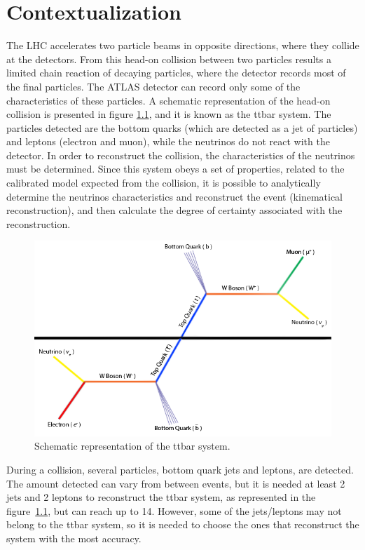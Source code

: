 
\chapter{Contextualization}

The LHC accelerates two particle beams in opposite directions, where they collide at the detectors. From this head-on collision between two particles results a limited chain reaction of decaying particles, where the detector records most of the final particles. The ATLAS detector can record only some of the characteristics of these particles. A schematic representation of the head-on collision is presented in figure \ref{fig:ttbar}, and it is known as the ttbar system. The particles detected are the bottom quarks (which are detected as a jet of particles) and leptons (electron and muon), while the neutrinos do not react with the detector. In order to reconstruct the collision, the characteristics of the neutrinos must be determined. Since this system obeys a set of properties, related to the calibrated model expected from the collision, it is possible to analytically determine the neutrinos characteristics and reconstruct the event (kinematical reconstruction), and then calculate the degree of certainty associated with the reconstruction.

\begin{figure}[!htp]
	\begin{center}
		\includegraphics[scale=0.5]{../../common/img/ttbar.png}
		\caption{Schematic representation of the ttbar system.}
		\label{fig:ttbar}
	\end{center}
\end{figure}

During a collision, several particles, bottom quark jets and leptons, are detected. The amount detected can vary from between events, but it is needed at least 2 jets and 2 leptons to reconstruct the ttbar system, as represented in the figure~\ref{fig:ttbar}, but can reach up to 14. However, some of the jets/leptons may not belong to the ttbar system, so it is needed to choose the ones that reconstruct the system with the most accuracy.


